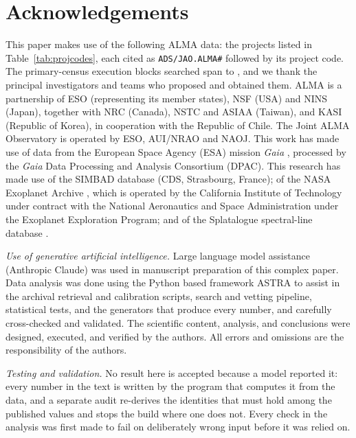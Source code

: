 \section*{Acknowledgements}
This paper makes use of the following ALMA data: the \NProjCodes{} projects
listed in Table~\ref{tab:projcodes}, each cited as \texttt{ADS/JAO.ALMA\#}
followed by its project code. The \NEB{} primary-census execution blocks
searched span \PrEbDateFirst{} to \PrEbDateLast{}, and we thank the principal
investigators and teams who proposed and obtained
them.\ProjCodeUnresClause{} ALMA is a partnership of ESO
(representing its member states), NSF (USA) and NINS (Japan), together with NRC
(Canada), NSTC and ASIAA (Taiwan), and KASI (Republic of Korea), in cooperation
with the Republic of Chile. The Joint ALMA Observatory is operated by ESO,
AUI/NRAO and NAOJ. This work has made use of data from the European Space
Agency (ESA) mission {\it Gaia} \citep{GaiaDR3}, processed by the {\it Gaia}
Data Processing and Analysis Consortium (DPAC). This research has made use
of the SIMBAD database \citep{SIMBAD2000} (CDS, Strasbourg, France); of the
NASA Exoplanet Archive \citep{NEA2013}, which is operated by the California
Institute of Technology under contract with the National Aeronautics and
Space Administration under the Exoplanet Exploration Program; and of the
Splatalogue spectral-line database \citep{Splatalogue2007}.

\emph{Use of generative artificial intelligence.} Large language model
assistance (Anthropic Claude) was used in manuscript preparation of this
complex paper. Data analysis was done using the Python based framework ASTRA
\citep[][\href{https://arxiv.org/abs/2610.36144}{https://\allowbreak arxiv.org/\allowbreak abs/}]{White2026ASTRA}
to assist in the archival retrieval and calibration scripts, search and
vetting pipeline, statistical tests, and the generators that produce every
number, and carefully cross-checked and validated. The scientific content,
analysis, and conclusions were designed, executed, and verified by the
authors. All errors and omissions are the responsibility of the authors.

\emph{Testing and validation.} No result here is accepted because a model
reported it: every number in the text is written by the program that computes it from the
data, and a separate audit re-derives the identities that must hold among the
published values and stops the build where one does not. Every check in the
analysis was first made to fail on deliberately wrong input before it was
relied on.

